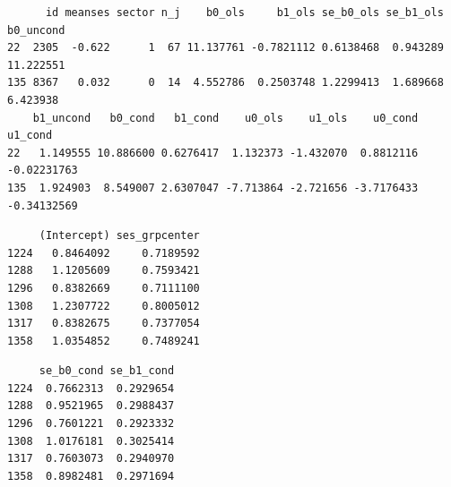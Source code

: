 \documentclass[
  letterpaper,
  DIV=11,
  numbers=noendperiod]{scrreprt}
\newenvironment{Shaded}{\begin{snugshade}}{\end{snugshade}}
\newcommand{\CommentTok}[1]{\textcolor[rgb]{0.38,0.63,0.69}{\textit{#1}}}
\newcommand{\FloatTok}[1]{\textcolor[rgb]{0.25,0.63,0.44}{#1}}
\newcommand{\FunctionTok}[1]{\textcolor[rgb]{0.02,0.16,0.49}{#1}}
\newcommand{\NormalTok}[1]{\textcolor[rgb]{0.00,0.44,0.13}{#1}}
\newcommand{\OtherTok}[1]{\textcolor[rgb]{0.00,0.44,0.13}{#1}}
\newcommand{\SpecialCharTok}[1]{\textcolor[rgb]{0.25,0.44,0.63}{#1}}
\newcommand{\StringTok}[1]{\textcolor[rgb]{0.25,0.44,0.63}{#1}}
\begin{document}
\begin{verbatim}
      id meanses sector n_j    b0_ols     b1_ols se_b0_ols se_b1_ols b0_uncond
22  2305  -0.622      1  67 11.137761 -0.7821112 0.6138468  0.943289 11.222551
135 8367   0.032      0  14  4.552786  0.2503748 1.2299413  1.689668  6.423938
    b1_uncond   b0_cond   b1_cond    u0_ols    u1_ols    u0_cond     u1_cond
22   1.149555 10.886600 0.6276417  1.132373 -1.432070  0.8812116 -0.02231763
135  1.924903  8.549007 2.6307047 -7.713864 -2.721656 -3.7176433 -0.34132569
\end{verbatim}

\begin{Shaded}
\end{Shaded}

\begin{verbatim}
     (Intercept) ses_grpcenter
1224   0.8464092     0.7189592
1288   1.1205609     0.7593421
1296   0.8382669     0.7111100
1308   1.2307722     0.8005012
1317   0.8382675     0.7377054
1358   1.0354852     0.7489241
\end{verbatim}

\begin{Shaded}
\end{Shaded}

\begin{verbatim}
     se_b0_cond se_b1_cond
1224  0.7662313  0.2929654
1288  0.9521965  0.2988437
1296  0.7601221  0.2923332
1308  1.0176181  0.3025414
1317  0.7603073  0.2940970
1358  0.8982481  0.2971694
\end{verbatim}
\end{document}
